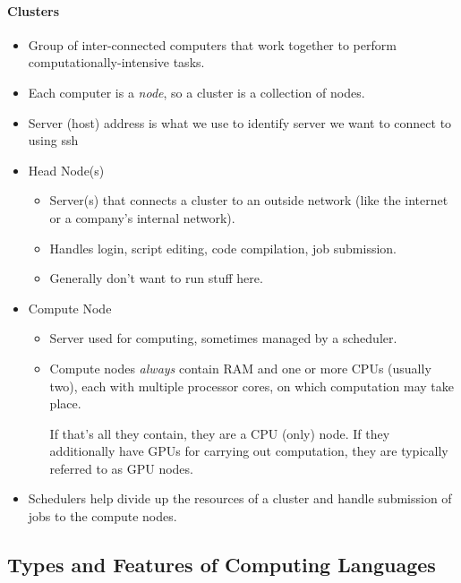 \documentclass[12pt]{article}
\theoremstyle{plain}
\theoremstyle{definition}
\theoremstyle{remark}
\begin{document}
\paragraph{Clusters}
\begin{itemize}
  \item Group of inter-connected computers that work together to perform
    computationally-intensive tasks.
  \item Each computer is a \emph{node}, so a cluster is a collection of
    nodes.
  \item Server (host) address is what we use to identify server we
    want to connect to using ssh
  \item
    Head Node(s)
    \begin{itemize}
      \item Server(s) that connects a cluster to an outside network (like
        the internet or a company's internal network).
      \item Handles login, script editing, code compilation, job submission.
      \item Generally don't want to run stuff here.
    \end{itemize}
  \item
    Compute Node
    \begin{itemize}
    \item Server used for computing, sometimes managed by a scheduler.
    \item Compute nodes \emph{always} contain RAM and one or more CPUs
      (usually two), each with multiple processor cores, on which
      computation may take place.

      If that's all they contain, they are a CPU (only) node.
      If they additionally have GPUs for carrying out computation, they
      are typically referred to as GPU nodes.
    \end{itemize}
  \item Schedulers help divide up the resources of a cluster and handle
    submission of jobs to the compute nodes.
\end{itemize}


\clearpage
\subsection{Types and Features of Computing Languages}
\end{document}
